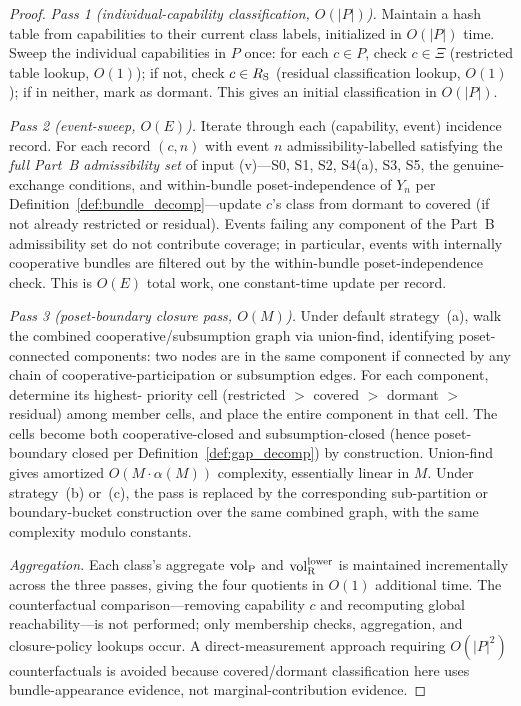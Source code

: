 \begin{proof}
\emph{Pass 1 (individual-capability classification,
$O(|P|)$).}
Maintain a hash table from capabilities to their current class
labels, initialized in $O(|P|)$ time.  Sweep the individual
capabilities in $P$ once: for each $c \in P$, check $c \in \Xi$
(restricted table lookup, $O(1)$); if not, check $c \in R_{\mathrm{S}}$
(residual classification lookup, $O(1)$); if in neither, mark as
dormant.  This gives an initial classification in $O(|P|)$.

\emph{Pass 2 (event-sweep, $O(E)$).}
Iterate through each (capability, event) incidence record.  For
each record $(c, n)$ with event $n$ admissibility-labelled
satisfying the \emph{full Part~B admissibility set} of input
(v)---S0, S1, S2, S4(a), S3, S5, the genuine-exchange
conditions, and within-bundle poset-independence of $Y_n$ per
Definition~\ref{def:bundle_decomp}---update $c$'s class from
dormant to covered (if not already restricted or residual).
Events failing any component of the Part~B admissibility set do
not contribute coverage; in particular, events with internally
cooperative bundles are filtered out by the within-bundle
poset-independence check.  This is $O(E)$ total work, one
constant-time update per record.

\emph{Pass 3 (poset-boundary closure pass, $O(M)$).}
Under default strategy~(a), walk the combined
cooperative/subsumption graph via union-find, identifying
poset-connected components: two nodes are in the same component
if connected by any chain of cooperative-participation or
subsumption edges.  For each component, determine its highest-
priority cell (restricted $>$ covered $>$ dormant $>$ residual)
among member cells, and place the entire component in that
cell.  The cells become both cooperative-closed and
subsumption-closed (hence poset-boundary closed per
Definition~\ref{def:gap_decomp}) by construction.  Union-find
gives amortized $O(M \cdot \alpha(M))$ complexity, essentially
linear in $M$.  Under strategy~(b) or~(c), the pass is replaced
by the corresponding sub-partition or boundary-bucket
construction over the same combined graph, with the same
complexity modulo constants.

\emph{Aggregation.}
Each class's aggregate ${\operatorname{vol}_{\mathrm{P}}}$ and ${\operatorname{vol}_{\mathrm{R}}^{\mathrm{lower}}}$ is maintained
incrementally across the three passes, giving the four quotients
in $O(1)$ additional time.  The counterfactual
comparison---removing capability $c$ and recomputing global
reachability---is not performed; only membership checks,
aggregation, and closure-policy lookups occur.  A
direct-measurement approach requiring $O(|P|^2)$ counterfactuals
is avoided because covered/dormant classification here uses
bundle-appearance evidence, not marginal-contribution evidence.
\end{proof}

